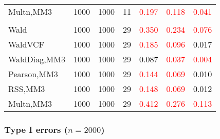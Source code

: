 \documentclass[
]{article}
\begin{document}
\begin{table}[H]
{\begin{tabular}[t]{lrrrrrr}
\hspace{1em}Multn,MM3 & 1000 & 1000 & 11 & \textcolor{red}{0.197} & \textcolor{red}{0.118} & \textcolor{red}{0.041}\\
\addlinespace[0.3em]
\multicolumn{7}{l}{\textbf{3F 15V}}\\
\hspace{1em}Wald & 1000 & 1000 & 29 & \textcolor{red}{0.350} & \textcolor{red}{0.234} & \textcolor{red}{0.076}\\
\hspace{1em}WaldVCF & 1000 & 1000 & 29 & \textcolor{red}{0.185} & \textcolor{red}{0.096} & \textcolor{black}{0.017}\\
\hspace{1em}WaldDiag,MM3 & 1000 & 1000 & 29 & \textcolor{black}{0.087} & \textcolor{red}{0.037} & \textcolor{red}{0.004}\\
\hspace{1em}Pearson,MM3 & 1000 & 1000 & 29 & \textcolor{red}{0.144} & \textcolor{red}{0.069} & \textcolor{black}{0.010}\\
\hspace{1em}RSS,MM3 & 1000 & 1000 & 29 & \textcolor{red}{0.148} & \textcolor{red}{0.069} & \textcolor{black}{0.012}\\
\hspace{1em}Multn,MM3 & 1000 & 1000 & 29 & \textcolor{red}{0.412} & \textcolor{red}{0.276} & \textcolor{red}{0.113}\\
\bottomrule
\end{tabular}}
\endgroup{}
\end{table}

\hypertarget{type-i-errors-n2000-3}{%
\subsubsection{\texorpdfstring{Type I errors
(\(n=2000\))}{Type I errors (n=2000)}}\label{type-i-errors-n2000-3}}
\end{document}
